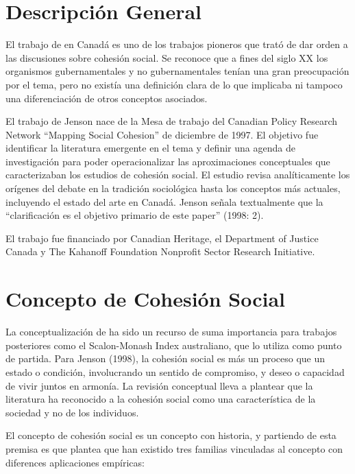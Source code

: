 \documentclass[
  12pt,
]{book}
\begin{document}
\hypertarget{descripciuxf3n-general}{%
\section{Descripción General}\label{descripciuxf3n-general}}

El trabajo de \citet{jenson1998mapping} en Canadá es uno de los trabajos
pioneros que trató de dar orden a las discusiones sobre cohesión social.
Se reconoce que a fines del siglo XX los organismos gubernamentales y no
gubernamentales tenían una gran preocupación por el tema, pero no
existía una definición clara de lo que implicaba ni tampoco una diferenciación de otros conceptos asociados.

El trabajo de Jenson nace de la Mesa de trabajo del Canadian Policy
Research Network ``Mapping Social Cohesion'' de diciembre de 1997. El
objetivo fue identificar la literatura emergente en el tema y definir
una agenda de investigación para poder operacionalizar las aproximaciones conceptuales que caracterizaban los estudios de cohesión social. El estudio revisa
analíticamente los orígenes del debate en la tradición sociológica hasta
los conceptos más actuales, incluyendo el estado del arte en Canadá.
Jenson señala textualmente que la ``clarificación es el objetivo primario
de este paper'' (1998: 2).

El trabajo fue financiado por Canadian Heritage, el Department of
Justice Canada y The Kahanoff Foundation Nonprofit Sector Research
Initiative.

\hypertarget{concepto-de-cohesiuxf3n-social}{%
\section{Concepto de Cohesión Social}\label{concepto-de-cohesiuxf3n-social}}

La conceptualización de \citet{jenson1998mapping} ha sido un recurso de suma importancia para trabajos posteriores como el Scalon-Monash Index australiano, que lo utiliza como punto de partida. Para Jenson (1998), la cohesión social es más un proceso que un estado o condición, involucrando un sentido de compromiso, y deseo o capacidad de vivir juntos en armonía. La revisión conceptual lleva a plantear que la literatura ha reconocido a la cohesión social como una característica de la
sociedad y no de los individuos.

El concepto de cohesión social es un concepto con historia, y partiendo de esta premisa es que \citet{jenson2010defining} plantea que han existido tres familias vinculadas al concepto con diferences aplicaciones empíricas:
\end{document}
